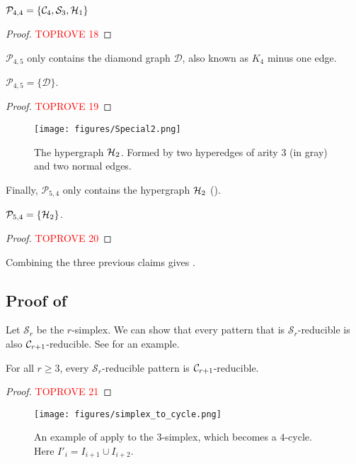 \documentclass[a4paper,UKenglish,cleveref, autoref, numberwithinsect, thm-restate]{lipics-v2021}
\newcommand{\reducible}[1]{${#1}$-reducible}
\newcommand{\cycle}[1]{\cC_{#1}}
\newcommand{\simplex}[1]{\cS_{#1}}
\newcommand{\hyperone}{\cH_1}
\newcommand{\hypertwo}{\cH_2}
\newcommand{\diamondgraph}{\cD}
\newcommand{\cC}{{\cal C}}
\newcommand{\cD}{\mathcal{D}}
\newcommand{\cH}{{\cal H}}
\newcommand{\cP}{\mathcal{P}}
\newcommand{\cS}{\mathcal{S}}
\begin{document}
	\begin{claim}
		$\mathcal{P}_{4,4} = \{\cycle{4}, \simplex{3}, \hyperone \}$
	\end{claim}
	\begin{proof}\textcolor{red}{TOPROVE 18}\end{proof}

	$\cP_{4,5}$ only contains the diamond graph $\diamondgraph$, also known as $K_4$ minus one edge.

	\begin{claim}
		$\mathcal{P}_{4,5} = \{\diamondgraph \}$.
	\end{claim}
	\begin{proof}\textcolor{red}{TOPROVE 19}\end{proof}

	\begin{figure}
		\centering
		\texttt{[image: figures/Special2.png]}\caption{The hypergraph $\hypertwo$. Formed by two hyperedges of arity $3$ (in gray) and two normal edges.}
		\label{fig:hypertwo}
	\end{figure}
	
	Finally, $\mathcal{P}_{5,4}$ only contains the hypergraph $\hypertwo$ ().
	
	\begin{claim}
		$\mathcal{P}_{5,4} = \{\hypertwo\}$.
	\end{claim}
	\begin{proof}\textcolor{red}{TOPROVE 20}\end{proof}

	Combining the three previous claims gives .
	
	\subsection{Proof of }
	
	Let $\simplex{r}$ be the $r$-simplex. We can show that every pattern that is \reducible{\simplex{r}} is also \reducible{\cycle{r+1}}. See  for an example.
	\begin{lemma} \label{lem:simplex}
		For all $r\geq 3$, every \reducible{\simplex{r}} pattern is \reducible{\cycle{r+1}}.
	\end{lemma}
	\begin{proof}\textcolor{red}{TOPROVE 21}\end{proof}
	
	\begin{figure}
		\centering
		\texttt{[image: figures/simplex\_to\_cycle.png]}\caption{An example of apply  to the $3$-simplex, which becomes a $4$-cycle. Here $I'_i =  I_{i+1}\cup I_{i+2}$.}
		\label{fig:simplex}
	\end{figure}
\end{document}
